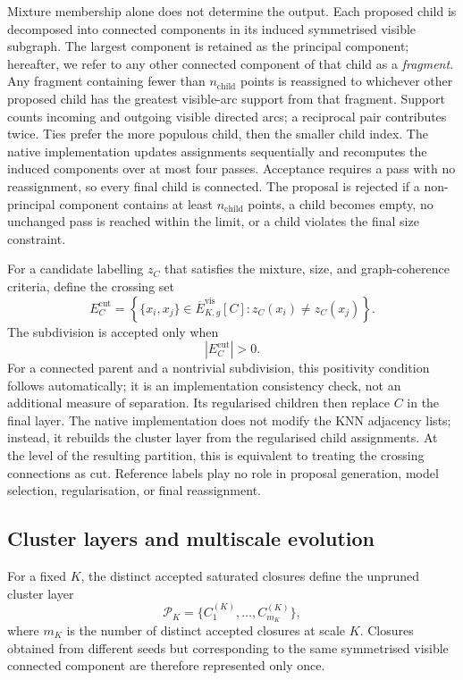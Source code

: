 \documentclass[review,12pt]{elsarticle}
\newcommand{\calP}{\mathcal{P}}
\begin{document}
Mixture membership alone does not determine the output. Each proposed child
is decomposed into connected components in its induced symmetrised visible
subgraph. The largest component is retained as the principal component; hereafter,
we refer to any other connected component of that child as a \emph{fragment}.
Any fragment containing fewer than $n_{\mathrm{child}}$ points is reassigned
to whichever other proposed child has the greatest visible-arc support from
that fragment. Support counts incoming and outgoing visible directed arcs;
a reciprocal pair contributes twice. Ties prefer the more populous child,
then the smaller child index. The native implementation updates assignments
sequentially and recomputes the induced components over at most four passes.
Acceptance requires a pass with no reassignment, so every final child is
connected. The proposal is rejected if a non-principal component contains
at least $n_{\mathrm{child}}$ points, a child becomes empty, no unchanged pass
is reached within the limit, or a child violates the final size constraint.

For a candidate labelling $z_C$ that satisfies the mixture, size, and
graph-coherence criteria, define the crossing set
\begin{equation}
E_C^{\mathrm{cut}}
=
\left\{
\{x_i,x_j\}\in\overline E_{K,g}^{\mathrm{vis}}[C]:
z_C(x_i)\neq z_C(x_j)
\right\}.
\label{eq:pruning_cut}
\end{equation}
The subdivision is accepted only when
\begin{equation}
|E_C^{\mathrm{cut}}|>0.
\end{equation}
For a connected parent and a nontrivial subdivision, this positivity
condition follows automatically; it is an implementation consistency check,
not an additional measure of separation. Its regularised children then
replace $C$ in the final layer. The native
implementation does not modify the KNN adjacency lists; instead, it rebuilds
the cluster layer from the regularised child assignments. At the level of the
resulting partition, this is equivalent to treating the crossing connections
as cut. Reference labels play no role in proposal generation, model selection,
regularisation, or final reassignment.

\subsection{Cluster layers and multiscale evolution}
\label{sec:layers}

For a fixed $K$, the distinct accepted saturated closures define the
unpruned cluster layer
\begin{equation}
\calP_K=
\{C_1^{(K)},\ldots,C_{m_K}^{(K)}\},
\end{equation}
where $m_K$ is the number of distinct accepted closures at scale $K$.
Closures obtained from different seeds but corresponding to the same
symmetrised visible connected component are therefore represented only once.
\end{document}

